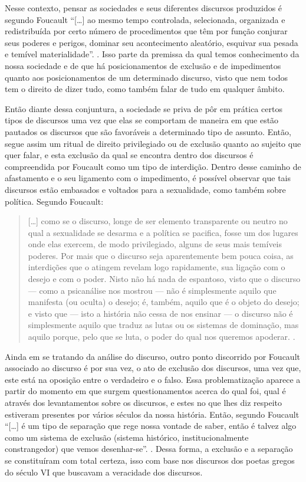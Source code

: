 \begin{refsection}
    Nesse contexto, pensar as sociedades e seus diferentes discursos produzidos é segundo Foucault ``[\dots] ao mesmo tempo controlada, selecionada, organizada e redistribuída por certo número de procedimentos que têm por função conjurar seus poderes e perigos, dominar seu acontecimento aleatório, esquivar sua pesada e temível materialidade''. \cite[p.~8--9]{Foucault1996Ordem}. Isso parte da premissa da qual temos conhecimento da nossa sociedade e de que há posicionamentos de exclusão e de impedimentos quanto aos posicionamentos de um determinado discurso, visto que nem todos tem o direito de dizer tudo, como também falar de tudo em qualquer âmbito.  

    Então diante dessa conjuntura, a sociedade se priva de pôr em prática certos tipos de discursos uma vez que elas se comportam de maneira em que estão pautados os discursos que são favoráveis a determinado tipo de assunto. Então, segue assim um ritual de direito privilegiado ou de exclusão quanto ao sujeito que quer falar, e esta exclusão da qual se encontra dentro dos discursos é compreendida por Foucault como um tipo de interdição. Dentro desse caminho de afastamento e o seu ligamento com o impedimento, é possível observar que tais discursos estão embasados e voltados para a sexualidade, como também sobre política. Segundo Foucault:

    \begin{quotation}
        [\dots] como se o discurso, longe de ser elemento transparente ou neutro no qual a sexualidade se desarma e a política se pacifica, fosse um dos lugares onde elas exercem, de modo privilegiado, alguns de seus mais temíveis poderes. Por mais que o discurso seja aparentemente bem pouca coisa, as interdições que o atingem revelam logo rapidamente, sua ligação com o desejo e com o poder. Nisto não há nada de espantoso, visto que o discurso --- como a psicanálise nos mostrou --- não é simplesmente aquilo que manifesta (ou oculta) o desejo; é, também, aquilo que é o objeto do desejo; e visto que --- isto a história não cessa de nos ensinar --- o discurso não é simplesmente aquilo que traduz as lutas ou os sistemas de dominação, mas aquilo porque, pelo que se luta, o poder do qual nos queremos apoderar. \cite[p.~9--10]{Foucault1996Ordem}.
    \end{quotation}

    Ainda em se tratando da análise do discurso, outro ponto discorrido por Foucault associado ao discurso é por sua vez, o ato de exclusão dos discursos, uma vez que, este está na oposição entre o verdadeiro e o falso. Essa problematização aparece a partir do momento em que surgem questionamentos acerca do qual foi, qual é através dos levantamentos sobre os discursos, e estes no que lhes diz respeito estiveram presentes por vários séculos da nossa história. Então, segundo Foucault ``[\dots] é um tipo de separação que rege nossa vontade de saber, então é talvez algo como um sistema de exclusão (sistema histórico, institucionalmente constrangedor) que vemos desenhar-se''. \cite[p.~14]{Foucault1996Ordem}. Dessa forma, a exclusão e a separação se constituíram com total certeza, isso com base nos discursos dos poetas gregos do século VI que buscavam a veracidade dos discursos.


\end{refsection}
